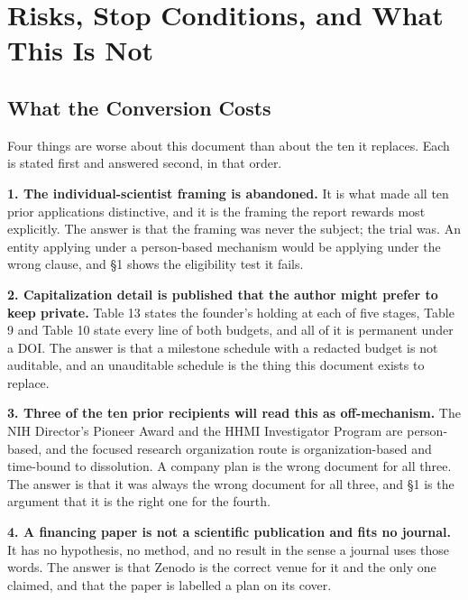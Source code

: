 \section{Risks, Stop Conditions, and What This Is Not}

\subsection{What the Conversion Costs}

Four things are worse about this document than about the ten it replaces. Each
is stated first and answered second, in that order.

\textbf{1. The individual-scientist framing is abandoned.} It is what made all
ten prior applications distinctive, and it is the framing the report rewards
most explicitly. The answer is that the framing was never the subject; the trial
was. An entity applying under a person-based mechanism would be applying under
the wrong clause, and \S1 shows the eligibility test it fails.

\textbf{2. Capitalization detail is published that the author might prefer to
keep private.} Table 13 states the founder's holding at each of five stages,
Table 9 and Table 10 state every line of both budgets, and all of it is
permanent under a DOI. The answer is that a milestone schedule with a redacted
budget is not auditable, and an unauditable schedule is the thing this document
exists to replace.

\textbf{3. Three of the ten prior recipients will read this as off-mechanism.}
The NIH Director's Pioneer Award and the HHMI Investigator Program are
person-based, and the focused research organization route is
organization-based and time-bound to dissolution. A company plan is the wrong
document for all three. The answer is that it was always the wrong document for
all three, and \S1 is the argument that it is the right one for the fourth.

\textbf{4. A financing paper is not a scientific publication and fits no
journal.} It has no hypothesis, no method, and no result in the sense a journal
uses those words. The answer is that Zenodo is the correct venue for it and the
only one claimed, and that the paper is labelled a plan on its cover.

